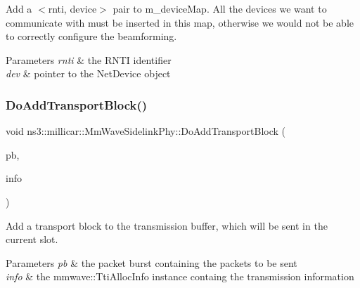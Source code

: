 Add a $<$rnti, device$>$ pair to m\+\_\+device\+Map. All the devices we want to communicate with must be inserted in this map, otherwise we would not be able to correctly configure the beamforming. 
\begin{DoxyParams}{Parameters}
{\em rnti} & the R\+N\+TI identifier \\
\hline
{\em dev} & pointer to the Net\+Device object \\
\hline
\end{DoxyParams}
\mbox{\label{classns3_1_1millicar_1_1MmWaveSidelinkPhy_a9a6b48f434ad30b0c61d246c6a98c766}} 
\subsubsection{\texorpdfstring{Do\+Add\+Transport\+Block()}{DoAddTransportBlock()}}
{\footnotesize\ttfamily void ns3\+::millicar\+::\+Mm\+Wave\+Sidelink\+Phy\+::\+Do\+Add\+Transport\+Block (\begin{DoxyParamCaption}\item[{Ptr$<$ Packet\+Burst $>$}]{pb,  }\item[{mmwave\+::\+Tti\+Alloc\+Info}]{info }\end{DoxyParamCaption})}

Add a transport block to the transmission buffer, which will be sent in the current slot. 
\begin{DoxyParams}{Parameters}
{\em pb} & the packet burst containing the packets to be sent \\
\hline
{\em info} & the mmwave\+::\+Tti\+Alloc\+Info instance containg the transmission information \\
\hline
\end{DoxyParams}
\mbox{\label{classns3_1_1millicar_1_1MmWaveSidelinkPhy_a8b5f228e68d5f66539d99bada58eff17}} 
